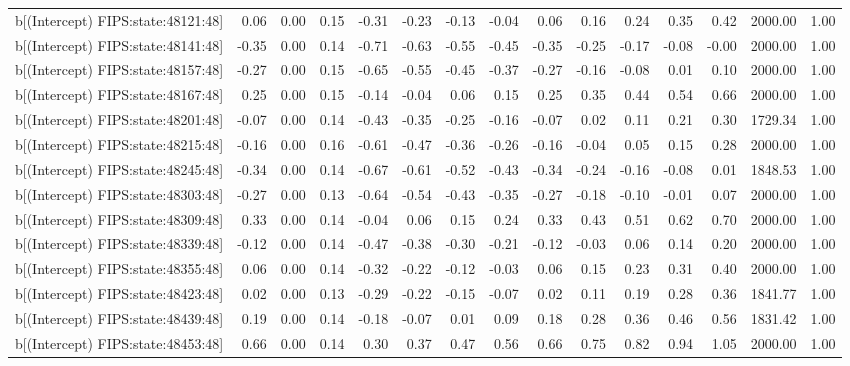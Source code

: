 \begin{table}[ht]
\begin{tabular}{rrrrrrrrrrrrrrr}
  b[(Intercept) FIPS:state:48121:48] & 0.06 & 0.00 & 0.15 & -0.31 & -0.23 & -0.13 & -0.04 & 0.06 & 0.16 & 0.24 & 0.35 & 0.42 & 2000.00 & 1.00 \\ 
  b[(Intercept) FIPS:state:48141:48] & -0.35 & 0.00 & 0.14 & -0.71 & -0.63 & -0.55 & -0.45 & -0.35 & -0.25 & -0.17 & -0.08 & -0.00 & 2000.00 & 1.00 \\ 
  b[(Intercept) FIPS:state:48157:48] & -0.27 & 0.00 & 0.15 & -0.65 & -0.55 & -0.45 & -0.37 & -0.27 & -0.16 & -0.08 & 0.01 & 0.10 & 2000.00 & 1.00 \\ 
  b[(Intercept) FIPS:state:48167:48] & 0.25 & 0.00 & 0.15 & -0.14 & -0.04 & 0.06 & 0.15 & 0.25 & 0.35 & 0.44 & 0.54 & 0.66 & 2000.00 & 1.00 \\ 
  b[(Intercept) FIPS:state:48201:48] & -0.07 & 0.00 & 0.14 & -0.43 & -0.35 & -0.25 & -0.16 & -0.07 & 0.02 & 0.11 & 0.21 & 0.30 & 1729.34 & 1.00 \\ 
  b[(Intercept) FIPS:state:48215:48] & -0.16 & 0.00 & 0.16 & -0.61 & -0.47 & -0.36 & -0.26 & -0.16 & -0.04 & 0.05 & 0.15 & 0.28 & 2000.00 & 1.00 \\ 
  b[(Intercept) FIPS:state:48245:48] & -0.34 & 0.00 & 0.14 & -0.67 & -0.61 & -0.52 & -0.43 & -0.34 & -0.24 & -0.16 & -0.08 & 0.01 & 1848.53 & 1.00 \\ 
  b[(Intercept) FIPS:state:48303:48] & -0.27 & 0.00 & 0.13 & -0.64 & -0.54 & -0.43 & -0.35 & -0.27 & -0.18 & -0.10 & -0.01 & 0.07 & 2000.00 & 1.00 \\ 
  b[(Intercept) FIPS:state:48309:48] & 0.33 & 0.00 & 0.14 & -0.04 & 0.06 & 0.15 & 0.24 & 0.33 & 0.43 & 0.51 & 0.62 & 0.70 & 2000.00 & 1.00 \\ 
  b[(Intercept) FIPS:state:48339:48] & -0.12 & 0.00 & 0.14 & -0.47 & -0.38 & -0.30 & -0.21 & -0.12 & -0.03 & 0.06 & 0.14 & 0.20 & 2000.00 & 1.00 \\ 
  b[(Intercept) FIPS:state:48355:48] & 0.06 & 0.00 & 0.14 & -0.32 & -0.22 & -0.12 & -0.03 & 0.06 & 0.15 & 0.23 & 0.31 & 0.40 & 2000.00 & 1.00 \\ 
  b[(Intercept) FIPS:state:48423:48] & 0.02 & 0.00 & 0.13 & -0.29 & -0.22 & -0.15 & -0.07 & 0.02 & 0.11 & 0.19 & 0.28 & 0.36 & 1841.77 & 1.00 \\ 
  b[(Intercept) FIPS:state:48439:48] & 0.19 & 0.00 & 0.14 & -0.18 & -0.07 & 0.01 & 0.09 & 0.18 & 0.28 & 0.36 & 0.46 & 0.56 & 1831.42 & 1.00 \\ 
  b[(Intercept) FIPS:state:48453:48] & 0.66 & 0.00 & 0.14 & 0.30 & 0.37 & 0.47 & 0.56 & 0.66 & 0.75 & 0.82 & 0.94 & 1.05 & 2000.00 & 1.00 \\ 

\end{tabular}
\end{table}
